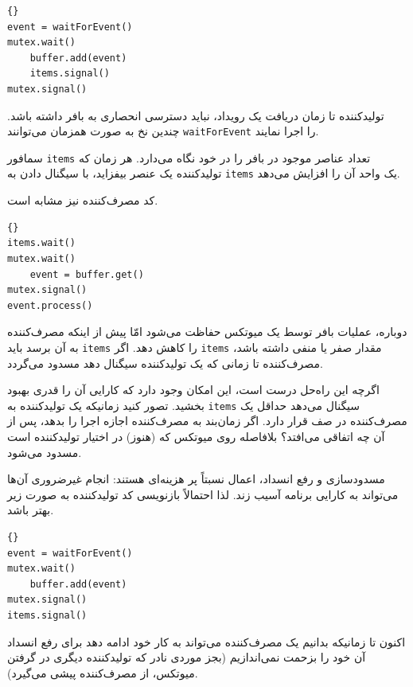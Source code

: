 \documentclass{book}
\begin{document}
\begin{latin}
\begin{lstlisting}[title=\rl{راه‌حل تولیدکننده}]{}
event = waitForEvent()
mutex.wait()
    buffer.add(event)
    items.signal()
mutex.signal()
\end{lstlisting}
\end{latin}

    تولیدکننده تا زمان دریافت یک رویداد، نباید دسترسی انحصاری به بافر داشته باشد. 
    چندین نخ به صورت همزمان می‌توانند  {\tt waitForEvent} را اجرا نمایند. 
    
    سمافور {\tt items} تعداد عناصر موجود در بافر را در خود نگاه می‌دارد. هر زمان که تولیدکننده یک عنصر بیفزاید، با سیگنال دادن  
    به {\tt items} یک واحد آن را افزایش می‌دهد. 

    کد مصرف‌کننده نیز مشابه است. 

\begin{latin}
\begin{lstlisting}[title=\rl{راه‌حل مصرف‌کننده}]{}
items.wait()
mutex.wait()
    event = buffer.get()
mutex.signal()
event.process()
\end{lstlisting}
\end{latin}

    دوباره، عملیات بافر توسط یک میوتکس حفاظت می‌شود امّا پیش از اینکه مصرف‌کننده به آن برسد باید {\tt items} را کاهش دهد. 
    اگر {\tt items} مقدار صفر یا منفی داشته باشد، مصرف‌کننده تا زمانی که یک تولیدکننده سیگنال دهد مسدود می‌گردد. 

    اگرچه این راه‌حل درست است، این امکان وجود دارد که کارایی آن را قدری بهبود بخشید. 
    تصور کنید زمانیکه یک تولیدکننده به {\tt items} سیگنال می‌دهد حداقل یک مصرف‌کننده در صف قرار دارد. 
    اگر زمان‌بند به مصرف‌کننده اجازه اجرا را بدهد، پس از آن چه اتفاقی می‌افتد؟
    بلافاصله روی میوتکس که (هنوز) در اختیار تولیدکننده است مسدود می‌شود. 

    مسدودسازی و رفع انسداد، اعمال نسبتاً پر هزینه‌ای هستند: 
    انجام غیرضروری آن‌ها می‌تواند به کارایی برنامه آسیب زند. لذا احتمالاً بازنویسی کد تولیدکننده به صورت زیر بهتر باشد. 
\begin{latin}
\begin{lstlisting}[title=\rl{راه‌حل بهبود یافتهٔ تولیدکننده}]{}
event = waitForEvent()
mutex.wait()
    buffer.add(event)
mutex.signal()
items.signal()
\end{lstlisting}
\end{latin}

    اکنون تا زمانیکه بدانیم یک مصرف‌کننده می‌تواند به کار خود ادامه دهد برای رفع انسداد آن خود را بزحمت نمی‌اندازیم 
    (بجز موردی نادر که تولید‌کننده‌ دیگری در گرفتن میوتکس، از مصرف‌کننده پیشی می‌گیرد).
    
\end{document}
